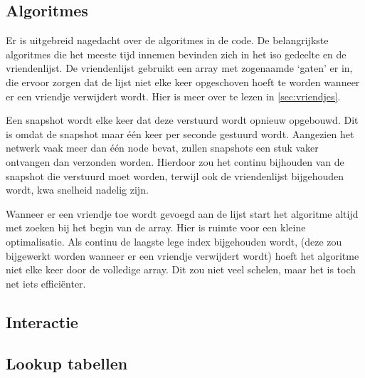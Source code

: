 \subsection{Algoritmes}

Er is uitgebreid nagedacht over de algoritmes in de code. De belangrijkste algoritmes die het meeste tijd innemen bevinden zich in het iso gedeelte en de vriendenlijst. De vriendenlijst gebruikt een array met zogenaamde `gaten' er in, die ervoor zorgen dat de lijst niet elke keer opgeschoven hoeft te worden wanneer er een vriendje verwijdert wordt. Hier is meer over te lezen in \autoref{sec:vriendjes}.

Een snapshot wordt elke keer dat deze verstuurd wordt opnieuw opgebouwd. Dit is omdat de snapshot maar één keer per seconde gestuurd wordt. Aangezien het netwerk vaak meer dan één node bevat, zullen snapshots een stuk vaker ontvangen dan verzonden worden. Hierdoor zou het continu bijhouden van de snapshot die verstuurd moet worden, terwijl ook de vriendenlijst bijgehouden wordt, kwa snelheid nadelig zijn.

Wanneer er een vriendje toe wordt gevoegd aan de lijst start het algoritme altijd met zoeken bij het begin van de array. Hier is ruimte voor een kleine optimalisatie. Als continu de laagste lege index bijgehouden wordt, (deze zou bijgewerkt worden wanneer er een vriendje verwijdert wordt) hoeft het algoritme niet elke keer door de volledige array. Dit zou niet veel schelen, maar het is toch net iets efficiënter.


\subsection{Interactie}

\subsection{Lookup tabellen}

